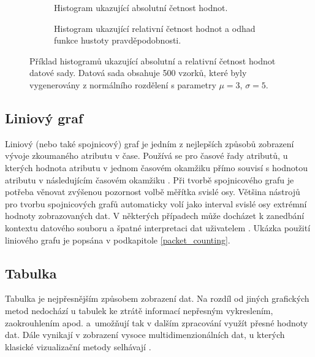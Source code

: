 \begin{figure}[h]%
    \centering
    \begin{subfigure}{0.5\textwidth}
        \centering
        \resizebox{1\textwidth}{!}
        {
            
        }
        \captionsetup{width=.9\linewidth}
        \caption{Histogram ukazující absolutní četnost hodnot.}
        \label{sub:histplot}
    \end{subfigure}%
    \begin{subfigure}{0.5\textwidth}
        \centering
        \resizebox{1\textwidth}{!}
        {
            
        }
        \captionsetup{width=.9\linewidth}
        \caption{Histogram ukazující relativní četnost hodnot a odhad funkce hustoty pravděpodobnosti.}
        \label{sub:distplot}
    \end{subfigure}

    
    \caption{Příklad histogramů ukazující absolutní a relativní četnost hodnot datové sady. Datová sada obsahuje 500 vzorků, které byly vygenerovány z normálního rozdělení s parametry $\mu=3$, $\sigma=5$.}%
    \label{hist_plots}%
\end{figure}


\subsection*{Liniový graf}



Liniový (nebo také spojnicový) graf je jedním z nejlepších způsobů zobrazení vývoje zkoumaného atributu v čase. Používá se pro časové řady atributů, u kterých hodnota atributu v jednom časovém okamžiku přímo souvisí s hodnotou atributu v následujícím časovém okamžiku \cite{statistika_a_my}. Při tvorbě spojnicového grafu je potřeba věnovat zvýšenou pozornost volbě měřítka svislé osy. Většina nástrojů pro tvorbu spojnicových grafů automaticky volí jako interval svislé osy extrémní hodnoty zobrazovaných dat. V některých případech může docházet k zanedbání kontextu datového souboru a špatné interpretaci dat uživatelem \cite{skiena}. Ukázka použití liniového grafu je popsána v podkapitole \ref{packet_counting}.

\subsection*{Tabulka}

Tabulka je nejpřesnějším způsobem zobrazení dat. Na rozdíl od jiných grafických metod nedochází u tabulek ke ztrátě informací nepřesným vykreslením, zaokrouhlením apod. a~umožňují tak v dalším zpracování využít přesné hodnoty dat. Dále vynikají v zobrazení vysoce multidimenzionálních dat, u kterých klasické vizualizační metody selhávají \cite{skiena}.

